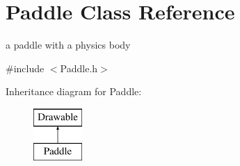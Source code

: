 \hypertarget{class_paddle}{\section{Paddle Class Reference}
\label{class_paddle}
}


a paddle with a physics body  




{\ttfamily \#include $<$Paddle.\+h$>$}

Inheritance diagram for Paddle\+:\begin{figure}[H]
\begin{center}
\leavevmode
\includegraphics[height=2.000000cm]{class_paddle}
\end{center}
\end{figure}

